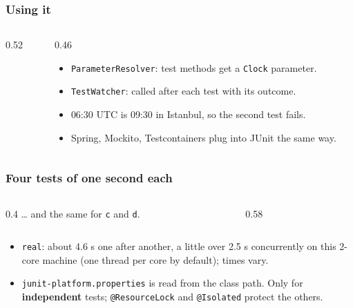 \documentclass[aspectratio=169,10pt,compress]{beamer}
\begin{document}
\begin{frame}[t,fragile] \frametitle{Using it}
  \begin{columns}[T]
    \begin{column}{0.52\textwidth}
    \end{column}
    \begin{column}{0.46\textwidth}
      \begin{itemize}\small
        \item \texttt{ParameterResolver}: test methods get a \texttt{Clock} parameter.
        \item \texttt{TestWatcher}: called after each test with its outcome.
        \item 06:30 UTC is 09:30 in Istanbul, so the second test fails.
        \item Spring, Mockito, Testcontainers plug into JUnit the same way.
      \end{itemize}
    \end{column}
  \end{columns}
\end{frame}





\begin{frame}[t,fragile] \frametitle{Four tests of one second each}
  \begin{columns}[T]
    \begin{column}{0.4\textwidth}
      \small \dots{} and the same for \texttt{c} and \texttt{d}.
    \end{column}
    \begin{column}{0.58\textwidth}
    \end{column}
  \end{columns}
  \begin{itemize}\small
    \item \texttt{real}: about 4.6 s one after another, a little over 2.5 s concurrently on this 2-core machine (one thread per core by default); times vary.
    \item \texttt{junit-platform.properties} is read from the class path. Only for \textbf{independent} tests;
          \texttt{@ResourceLock} and \texttt{@Isolated} protect the others.
  \end{itemize}
\end{frame}
\end{document}
